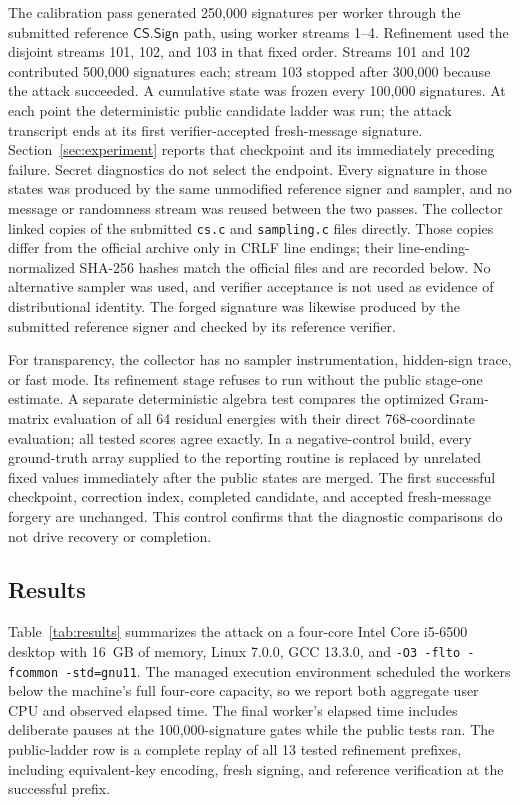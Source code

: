 \documentclass[11pt]{article}
\newcommand{\CS}{\mathsf{CS}}
\newcommand{\Sign}{\mathsf{Sign}}
\begin{document}
The calibration pass generated 250,000 signatures per worker through the submitted reference
$\CS.\Sign$ path, using worker streams 1--4.  Refinement used the disjoint streams 101, 102,
and 103 in that fixed order.  Streams 101 and 102 contributed 500,000 signatures each; stream
103 stopped after 300,000 because the attack succeeded.  A cumulative state was frozen every 100,000 signatures.  At each
point the deterministic public candidate ladder was run; the attack transcript ends at its first
verifier-accepted fresh-message signature.  Section~\ref{sec:experiment} reports that checkpoint
and its immediately preceding failure.  Secret diagnostics do not select the endpoint.  Every signature
in those states was produced by the same unmodified reference signer and sampler, and no message
or randomness stream was reused between the two passes.  The collector linked copies
of the submitted \texttt{cs.c} and \texttt{sampling.c} files directly.  Those copies differ
from the official archive only in CRLF line endings; their line-ending-normalized SHA-256
hashes match the official files and are recorded below.  No alternative sampler was used, and
verifier acceptance is not used as evidence of distributional identity.  The forged signature
was likewise produced by the submitted reference signer and checked by its reference verifier.

For transparency, the collector has no sampler instrumentation, hidden-sign trace, or fast
mode.  Its refinement stage refuses to run without the public stage-one estimate.  A separate
deterministic algebra test compares the optimized Gram-matrix evaluation of all 64 residual
energies with their direct 768-coordinate evaluation; all tested scores agree exactly.  In a
negative-control build, every ground-truth array supplied to the reporting routine is replaced
by unrelated fixed values immediately after the public states are merged.  The first successful
checkpoint, correction index, completed candidate, and accepted fresh-message forgery are
unchanged.  This control confirms that
the diagnostic comparisons do not drive recovery or completion.

\subsection{Results}

Table~\ref{tab:results} summarizes the attack on a four-core Intel Core i5-6500 desktop with
16~GB of memory, Linux 7.0.0, GCC 13.3.0, and
\texttt{-O3 -flto -fcommon -std=gnu11}.  The managed execution environment scheduled the
workers below the machine's full four-core capacity, so we report both aggregate user CPU and
observed elapsed time.  The final worker's elapsed time includes deliberate pauses at the
100,000-signature gates while the public tests ran.  The public-ladder row is a complete replay
of all 13 tested refinement prefixes, including equivalent-key encoding, fresh signing, and
reference verification at the successful prefix.
\end{document}

